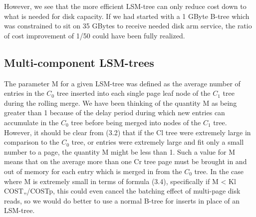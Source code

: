\documentclass[a4paper,12pt,notitlepage,twoside,openright]{article}
\begin{document}
However, we see that the more efficient LSM-tree can only reduce cost
down to what is needed for disk capacity. If we had started with a 1
GByte B-tree which was constrained to sit on 35 GBytes to receive needed
disk arm service, the ratio of cost improvement of 1/50 could have been
fully realized.


\hypertarget{multi-component-lsm-trees}{%
\subsection{Multi-component LSM-trees}\label{multi-component-lsm-trees}}


The parameter M for a given LSM-tree was defined as the average number
of entries in the \(C_0\) tree inserted into each single page leaf node of
the \(C_1\) tree during the rolling merge. We have been thinking of the
quantity M as being greater than 1 because of the delay period during
which new entries can accumulate in the \(C_0\) tree before being merged into
nodes of the \(C_1\) tree. However, it should be clear from (3.2) that if the
Cl tree were extremely large in comparison to the \(C_0\) tree, or entries
were extremely large and fit only a small number to a page, the quantity
M might be less than 1. Such a value for M means that on the average
more than one Cr tree page must be brought in and out of memory for each
entry which is merged in from the \(C_0\) tree. In the case where M is
extremely small in terms of formula (3.4), specifically if M \textless{}
Kl COST„/COSTp, this could even cancel the batching effect of multi-page
disk reads, so we would do better to use a normal B-tree for inserts in
place of an LSM-tree.
\end{document}
